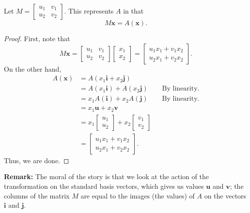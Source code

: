 \documentclass[letterpaper]{article}
\begin{document}
\begin{proposition}
    Let $M = \begin{bmatrix}
        u_1 & v_1 \\ u_2 & v_2
    \end{bmatrix}$. This represents $A$ in that
    \[M\mathbf{x} = A(\mathbf{x}).\]
\end{proposition}

\begin{mdframed}[nobreak=true]
    \begin{proof}
        First, note that
        \[M\mathbf{x} = \begin{bmatrix}
            u_1 & v_1 \\ u_2 & v_2
        \end{bmatrix} \begin{bmatrix}
            x_1 \\ x_2
        \end{bmatrix} = \begin{bmatrix}
            u_1 x_1 + v_1 x_2 \\ 
            u_2 x_1 + v_2 x_2
        \end{bmatrix}.\]
        On the other hand, 
        \begin{equation*}
            \begin{aligned}
                A(\mathbf{x}) &= A(x_1 \mathbf{i} + x_2 \mathbf{j}) \\ 
                    &= A(x_1 \mathbf{i}) + A(x_2 \mathbf{j}) && \text{By linearity.} \\ 
                    &= x_1 A(\mathbf{i}) + x_2 A(\mathbf{j}) && \text{By linearity.} \\ 
                    &= x_1 \mathbf{u} + x_2 \mathbf{v} \\ 
                    &= x_1 \begin{bmatrix}
                        u_1 \\ u_2
                    \end{bmatrix} + x_2 \begin{bmatrix}
                        v_1 \\ v_2
                    \end{bmatrix} \\ 
                    &= \begin{bmatrix}
                        u_1 x_1 + v_1 x_2 \\ 
                        u_2 x_1 + v_2 x_2
                    \end{bmatrix}.
            \end{aligned}
        \end{equation*}
        Thus, we are done. 
    \end{proof}
\end{mdframed}
\textbf{Remark:} The moral of the story is that we look at the action of the transformation on the standard basis vectors, which gives us values $\mathbf{u}$ and $\mathbf{v}$; the columns of the matrix $M$ are equal to the images (the values) of $A$ on the vectors $\mathbf{i}$ and $\mathbf{j}$.
\end{document}
